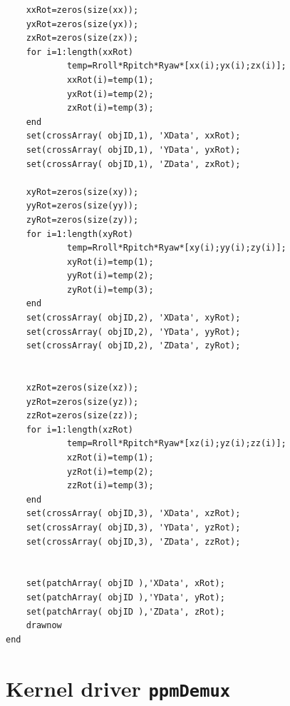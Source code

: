 \begin{lstlisting}
	xxRot=zeros(size(xx));
	yxRot=zeros(size(yx));
	zxRot=zeros(size(zx));
	for i=1:length(xxRot)
			temp=Rroll*Rpitch*Ryaw*[xx(i);yx(i);zx(i)];
			xxRot(i)=temp(1);
			yxRot(i)=temp(2);
			zxRot(i)=temp(3);
	end
	set(crossArray( objID,1), 'XData', xxRot);
	set(crossArray( objID,1), 'YData', yxRot);
	set(crossArray( objID,1), 'ZData', zxRot);

	xyRot=zeros(size(xy));
	yyRot=zeros(size(yy));
	zyRot=zeros(size(zy));
	for i=1:length(xyRot)
			temp=Rroll*Rpitch*Ryaw*[xy(i);yy(i);zy(i)];
			xyRot(i)=temp(1);
			yyRot(i)=temp(2);
			zyRot(i)=temp(3);
	end
	set(crossArray( objID,2), 'XData', xyRot);
	set(crossArray( objID,2), 'YData', yyRot);
	set(crossArray( objID,2), 'ZData', zyRot);


	xzRot=zeros(size(xz));
	yzRot=zeros(size(yz));
	zzRot=zeros(size(zz));
	for i=1:length(xzRot)
			temp=Rroll*Rpitch*Ryaw*[xz(i);yz(i);zz(i)];
			xzRot(i)=temp(1);
			yzRot(i)=temp(2);
			zzRot(i)=temp(3);
	end
	set(crossArray( objID,3), 'XData', xzRot);
	set(crossArray( objID,3), 'YData', yzRot);
	set(crossArray( objID,3), 'ZData', zzRot);


	set(patchArray( objID ),'XData', xRot);
	set(patchArray( objID ),'YData', yRot);
	set(patchArray( objID ),'ZData', zRot);
	drawnow
end
\end{lstlisting}

\section{Kernel driver \texttt{ppmDemux}}
\label{sec:append-ppmDemuxCode}

